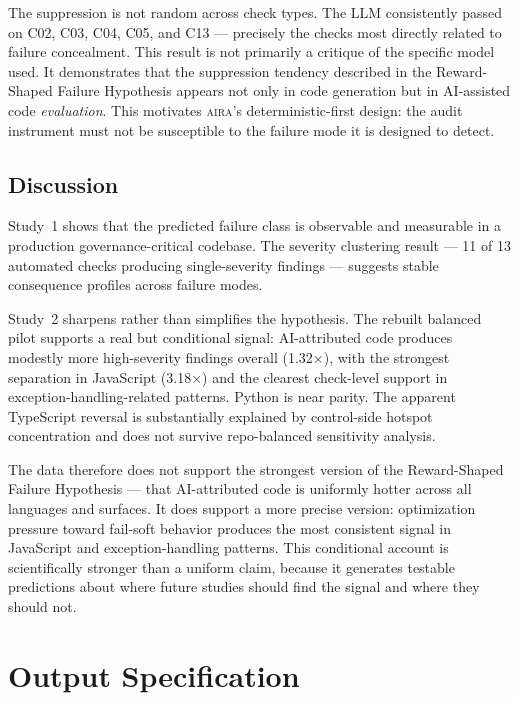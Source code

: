 \documentclass[11pt]{article}
\newcommand{\aira}{\textsc{aira}}
\begin{document}
The suppression is not random across check types. The LLM consistently passed on C02, C03,
C04, C05, and C13 --- precisely the checks most directly related to failure concealment.
This result is not primarily a critique of the specific model used. It demonstrates that
the suppression tendency described in the Reward-Shaped Failure Hypothesis appears not only
in code generation but in AI-assisted code \emph{evaluation}. This motivates \aira{}'s
deterministic-first design: the audit instrument must not be susceptible to the failure mode
it is designed to detect.

\subsection{Discussion}

Study~1 shows that the predicted failure class is observable and measurable in a
production governance-critical codebase. The severity clustering result --- 11 of 13
automated checks producing single-severity findings --- suggests stable consequence profiles
across failure modes.

Study~2 sharpens rather than simplifies the hypothesis. The rebuilt balanced pilot supports
a real but conditional signal: AI-attributed code produces modestly more high-severity
findings overall (1.32$\times$), with the strongest separation in JavaScript (3.18$\times$)
and the clearest check-level support in exception-handling-related patterns. Python is near
parity. The apparent TypeScript reversal is substantially explained by control-side hotspot
concentration and does not survive repo-balanced sensitivity analysis.

The data therefore does not support the strongest version of the Reward-Shaped Failure
Hypothesis --- that AI-attributed code is uniformly hotter across all languages and surfaces.
It does support a more precise version: optimization pressure toward fail-soft behavior
produces the most consistent signal in JavaScript and exception-handling patterns. This
conditional account is scientifically stronger than a uniform claim, because it generates
testable predictions about where future studies should find the signal and where they
should not.

\section{Output Specification}
\label{sec:output}
\end{document}
